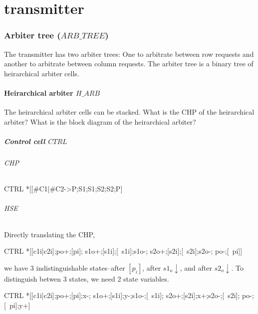 \documentclass{article}
\begin{document}
\part{transmitter}

\section{Arbiter tree ($ARB\_TREE$)}
The transmitter has two arbiter trees: One to arbitrate between row requests and another to arbitrate between column requests. The arbiter tree is a binary tree of heirarchical arbiter cells.

\subsection{Heirarchical arbiter $H\_ARB$}

The heirarchical arbiter cells can be stacked. What is the CHP of the heirarchical arbiter? What is the block diagram of the heirarchical arbiter?

\subsubsection{Control cell $CTRL$}

\paragraph{CHP} 

\begin{csp}
CTRL\equiv
  *[[#{C1}|#{C2}->P;S1;S1;S2;S2;P]
\end{csp}

\paragraph{HSE} 

Directly translating the CHP,

\begin{hse}
CTRL\equiv
  *[[c1i|c2i];po+;[pi];
    s1o+;[s1i];[~s1i];s1o-;
    s2o+;[s2i];[~s2i];s2o-;
    po-;[~pi]]
\end{hse}

\noindent we have 3 indistinguishable states--after $[p_i]$, after $s1_o\!\downarrow$, and after $s2_o\!\downarrow$. To distinguish betwen 3 states, we need 2 state variables.

\begin{hse}
CTRL\equiv
  *[[c1i|c2i];po+;[pi];x-;
    s1o+;[s1i];y-;s1o-;[~s1i];
    s2o+;[s2i];x+;s2o-;[~s2i];
    po-;[~pi];y+]
\end{hse}
\end{document}
